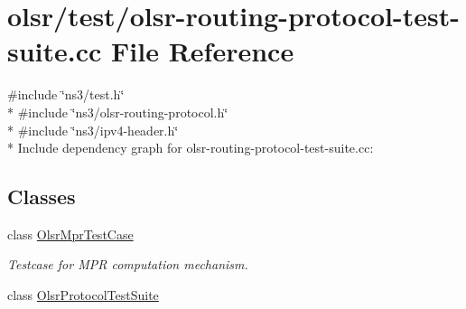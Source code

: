 \hypertarget{olsr-routing-protocol-test-suite_8cc}{}\section{olsr/test/olsr-\/routing-\/protocol-\/test-\/suite.cc File Reference}
\label{olsr-routing-protocol-test-suite_8cc}
{\ttfamily \#include \char`\"{}ns3/test.\+h\char`\"{}}\\*
{\ttfamily \#include \char`\"{}ns3/olsr-\/routing-\/protocol.\+h\char`\"{}}\\*
{\ttfamily \#include \char`\"{}ns3/ipv4-\/header.\+h\char`\"{}}\\*
Include dependency graph for olsr-\/routing-\/protocol-\/test-\/suite.cc\+:
\subsection*{Classes}
\begin{DoxyCompactItemize}
\item 
class \hyperlink{classOlsrMprTestCase}{Olsr\+Mpr\+Test\+Case}
\begin{DoxyCompactList}\small\item\em Testcase for M\+PR computation mechanism. \end{DoxyCompactList}\item 
class \hyperlink{classOlsrProtocolTestSuite}{Olsr\+Protocol\+Test\+Suite}
\end{DoxyCompactItemize}
